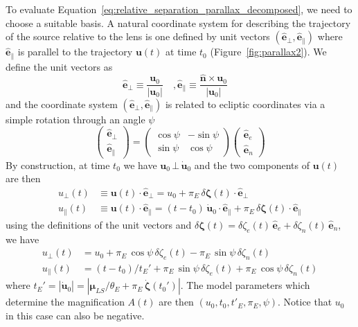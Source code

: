 \documentclass[12pt,dvipsnames]{report}
\begin{document}
To evaluate Equation~\ref{eq:relative_separation_parallax_decomposed}, we need
to choose a suitable basis. A natural coordinate system for describing the
trajectory of the source relative to the lens is one defined by unit vectors
$(\mathbf{\hat e}_\bot,\mathbf{\hat e}_\parallel)$ where $\mathbf{\hat e}_\parallel$ is parallel to the trajectory $\mathbf{u}(t)$ at time $t_0$
(Figure~\ref{fig:parallax2}). We define the unit vectors as
\begin{equation}
    \mathbf{\hat e}_\bot\equiv \frac{\mathbf{u}_0}{|\mathbf{u}_0|}\quad,
    \mathbf{\hat e}_\parallel\equiv \frac{\mathbf{\hat n}\times\mathbf{u}_0}{|\mathbf{u}_0|}\quad
\end{equation}
and the coordinate system $(\mathbf{\hat e}_\bot,\mathbf{\hat e}_\parallel)$ is related to ecliptic coordinates via a simple rotation through an
angle $\psi$
\begin{equation}
    \begin{pmatrix}
        \mathbf{\hat e}_\bot \\
        \mathbf{\hat e}_\parallel
    \end{pmatrix}
    =
    \begin{pmatrix}
        \cos\psi & -\sin\psi \\
        \sin\psi & \cos\psi
    \end{pmatrix}
    \begin{pmatrix}
        \mathbf{\hat e}_e \\
        \mathbf{\hat e}_n
    \end{pmatrix}
    \label{eq:ecliptic_to_parallel}
\end{equation}
By construction, at time $t_0$ we have
$\mathbf{u}_0\,\bot\,\dot{\mathbf{u}}_0$ and the two components of
$\mathbf{u}(t)$ are then
\begin{align}
    u_\bot(t)      & \equiv \mathbf{u}(t)\cdot \mathbf{\hat e}_\bot= u_0 +
    \pi_E\,\delta\boldsymbol \zeta(t)\cdot\mathbf{\hat e}_\bot                                                                                                                                       \\
    u_\parallel(t) & \equiv \mathbf{u}(t)\cdot \mathbf{\hat e}_\parallel= (t-t_0)\,\dot{\mathbf{u}}_0\cdot\mathbf{\hat e}_\parallel+ \pi_E\,\delta\boldsymbol \zeta(t)\cdot\mathbf{\hat e}_\parallel
\end{align}
using the definitions of the unit vectors and
$\delta\boldsymbol \zeta(t)=
    \delta \zeta_e(t)\,\mathbf{\hat e}_e+\delta \zeta_n(t)\,\mathbf{\hat e}_n$, we have
\begin{align}
    u_\bot(t)      & = u_0 + \pi_E\,\cos\psi\,\delta \zeta_e(t) - \pi_E\,\sin\psi\,\delta \zeta_n(t)
    \label{eq:u_t_parallel1}                                                                         \\
    u_\parallel(t) & =(t-t_0)/t_E' + \pi_E\,\sin\psi\,\delta \zeta_e(t) +
    \pi_E\,\cos\psi\,\delta \zeta_n(t) \label{eq:u_t_parallel2}
\end{align}
where $t_E' =|\dot{\mathbf{u}}_0|=|\boldsymbol\mu_{LS}/\theta_E  + \pi_E\,\dot{\boldsymbol \zeta}(t_0')|$.
The model parameters which determine the magnification $A(t)$ are then
$\left(u_0,t_0,t'_E,\pi_E,\psi\right)$. Notice that $u_0$ in this case can also be negative.
\end{document}
